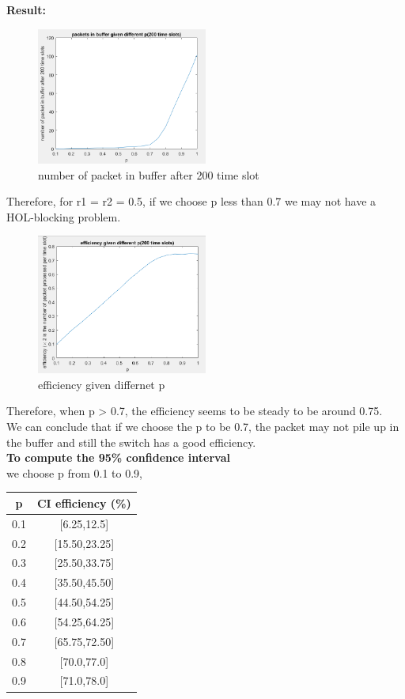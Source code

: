 \documentclass[twoside]{article}
\begin{document}
\begin{multicols*}{2}
\begin{lstlisting}
\end{lstlisting}
\noindent \textbf {Result:}
\begin{figure}[H]
   \centering
   \includegraphics[width = 0.5\textwidth]{./data/numPacket-p.PNG}  
   \caption{number of packet in buffer after 200 time slot}
\end{figure}
Therefore, for r1 = r2 = 0.5, if we choose p less than 0.7 we may not have a HOL-blocking problem.
\begin{figure}[H]
   \centering
   \includegraphics[width = 0.5\textwidth]{./data/efficiency.PNG}  
   \caption{efficiency given differnet p}
\end{figure}
Therefore, when p > 0.7, the efficiency seems to be steady to be around 0.75.\\
We can conclude that if we choose the p to be 0.7, the packet may not pile up in the buffer and still the switch has a good efficiency.\\
\noindent \textbf {To compute the 95\% confidence interval}\\
we choose p from 0.1 to 0.9,\\
\begin{tabular}{|| c | c ||}
 \hline \hline
 p & CI efficiency (\%) \\ \hline \hline
0.1 & [6.25,12.5]\\ \hline
0.2 & [15.50,23.25]\\ \hline
0.3 & [25.50,33.75]\\ \hline
0.4 & [35.50,45.50]\\ \hline
0.5 & [44.50,54.25]\\ \hline
0.6 & [54.25,64.25]\\ \hline
0.7 & [65.75,72.50]\\ \hline
0.8 & [70.0,77.0]\\ \hline
0.9 & [71.0,78.0]\\ \hline

\end{tabular}
\end{multicols*}
\end{document}
